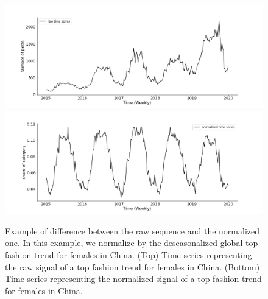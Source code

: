 \documentclass[review]{elsarticle}
\begin{document}
\begin{figure}
\centering
  \includegraphics[width=1.\linewidth]{figure/cn_female_top_raw}
  \includegraphics[width=1.\linewidth]{figure/cn_female_top_norm}
\caption{Example of difference between the raw sequence and the normalized one. In this example, we normalize by the deseasonalized global top fashion trend for females in China. (Top) Time series representing the raw signal of a top fashion trend for females in China. (Bottom) Time series representing the normalized signal of a top fashion trend for females in China.}
\label{fig:normalization}
\end{figure}
\end{document}
